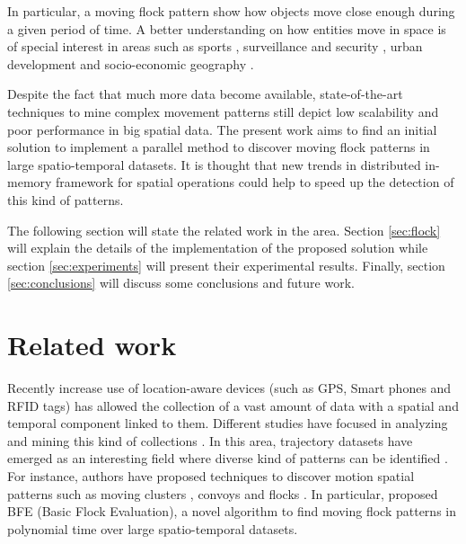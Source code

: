 \documentclass[12pt]{scrartcl}
\begin{document}
In particular, a moving flock pattern show how objects move close enough during a given period of time.  A better understanding on how entities move in space is of special interest in areas such as sports \citep{iwase_tracking_2002},  surveillance and security \citep{makris_path_2002,piciarelli_trajectory_2005}, urban development \citep{huang_trajgraph:_2016, long_combining_2015} and socio-economic geography \citep{frank_life_2000}.

Despite the fact that much more data become available, state-of-the-art techniques to mine complex movement patterns still depict low scalability and poor performance in big spatial data.  The present work aims to find an initial solution to implement a parallel method to discover moving flock patterns in large spatio-temporal datasets.  It is thought that new trends in distributed in-memory framework for spatial operations could help to speed up the detection of this kind of patterns.

The following section will state the related work in the area.  Section \ref{sec:flock} will explain the details of the implementation of the proposed solution while section \ref{sec:experiments} will present their experimental results. Finally, section \ref{sec:conclusions} will discuss some conclusions and future work. 

\section{Related work}
% 

Recently increase use of location-aware devices (such as GPS, Smart phones and RFID tags) has allowed the collection of a vast amount of data with a spatial and temporal component linked to them.  Different studies have focused in analyzing and mining this kind of collections \citep{leung_knowledge_2010, miller_geographic_2001}.  In this area, trajectory datasets have emerged as an interesting field where diverse kind of patterns can be identified \citep{zheng_computing_2011, vieira_spatio-temporal_2013}.  For instance, authors have proposed techniques to discover motion spatial patterns such as moving clusters \citep{kalnis_discovering_2005}, convoys \citep{jeung_discovery_2008} and flocks \citep{benkert_reporting_2008, gudmundsson_computing_2006}.  In particular, \cite{vieira_-line_2009} proposed BFE (Basic Flock Evaluation), a novel algorithm to find moving flock patterns in polynomial time over large spatio-temporal datasets.  
 
\end{document}

